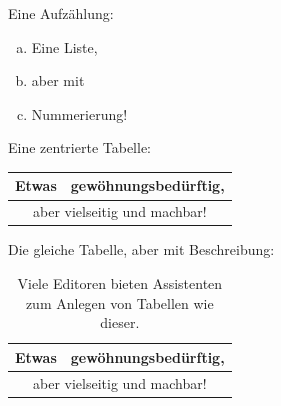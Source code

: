 Eine Aufzählung:
\begin{enumerate}[(a)]
  \item Eine Liste,
  \item aber mit
  \item Nummerierung!
\end{enumerate}

Eine zentrierte Tabelle:
\begin{center}
  \begin{tabular}{|c|c|} \hline
    Etwas         &  gewöhnungsbedürftig,         \\ \hline
    \multicolumn{2}{|c|}{aber vielseitig und machbar!} \\ \hline
  \end{tabular}
\end{center}

Die gleiche Tabelle, aber mit Beschreibung:
\begin{table}[h]
  \begin{center}
    \begin{tabular}{|c|c|} \hline
      Etwas         &  gewöhnungsbedürftig,        \\ \hline
      \multicolumn{2}{|c|}{aber vielseitig und machbar!} \\ \hline
    \end{tabular}
  \end{center}
  \caption{Viele Editoren bieten Assistenten zum Anlegen von Tabellen wie dieser.}
\end{table}


